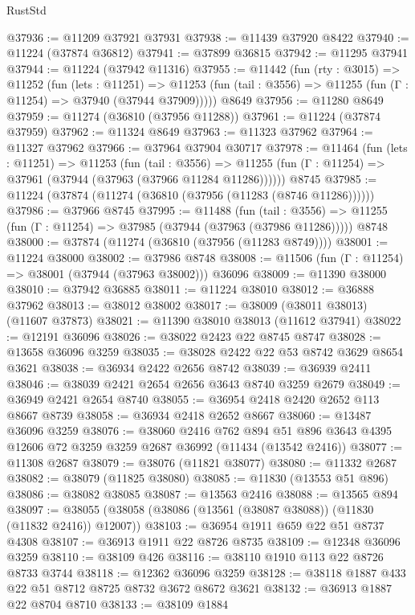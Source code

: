 \begin{lexlean}{RustStd}
\begin{coremodule}
@37936 := @11209 @37921 @37931
@37938 := @11439 @37920 @8422
@37940 := @11224 (@37874 @36812)
@37941 := @37899 @36815
@37942 := @11295 @37941
@37944 := @11224 (@37942 @11316)
@37955 := @11442
    (fun (rty : @3015) =>
    @11252
      (fun (lets : @11251) =>
      @11253 (fun (tail : @3556) => @11255 (fun (Γ : @11254) => @37940 (@37944 @37909)))))
    @8649
@37956 := @11280 @8649
@37959 := @11274 (@36810 (@37956 @11288))
@37961 := @11224 (@37874 @37959)
@37962 := @11324 @8649
@37963 := @11323 @37962
@37964 := @11327 @37962
@37966 := @37964 @37904 @30717
@37978 := @11464
    (fun (lets : @11251) =>
    @11253
      (fun (tail : @3556) =>
      @11255 (fun (Γ : @11254) => @37961 (@37944 (@37963 (@37966 @11284 @11286))))))
    @8745
@37985 := @11224 (@37874 (@11274 (@36810 (@37956 (@11283 (@8746 @11286))))))
@37986 := @37966 @8745
@37995 := @11488
    (fun (tail : @3556) => @11255 (fun (Γ : @11254) => @37985 (@37944 (@37963 (@37986 @11286)))))
    @8748
@38000 := @37874 (@11274 (@36810 (@37956 (@11283 @8749))))
@38001 := @11224 @38000
@38002 := @37986 @8748
@38008 := @11506 (fun (Γ : @11254) => @38001 (@37944 (@37963 @38002))) @36096
@38009 := @11390 @38000
@38010 := @37942 @36885
@38011 := @11224 @38010
@38012 := @36888 @37962
@38013 := @38012 @38002
@38017 := @38009 (@38011 @38013) (@11607 @37873)
@38021 := @11390 @38010 @38013 (@11612 @37941)
@38022 := @12191 @36096
@38026 := @38022 @2423 @22 @8745 @8747
@38028 := @13658 @36096 @3259
@38035 := @38028 @2422 @22 @53 @8742 @3629 @8654 @3621
@38038 := @36934 @2422 @2656 @8742
@38039 := @36939 @2411
@38046 := @38039 @2421 @2654 @2656 @3643 @8740 @3259 @2679
@38049 := @36949 @2421 @2654 @8740
@38055 := @36954 @2418 @2420 @2652 @113 @8667 @8739
@38058 := @36934 @2418 @2652 @8667
@38060 := @13487 @36096 @3259
@38076 := @38060
    @2416
    @762
    @894
    @51
    @896
    @3643
    @4395
    @12606
    @72
    @3259
    @3259
    @2687
    @36992
    (@11434 (@13542 @2416))
@38077 := @11308 @2687
@38079 := @38076 (@11821 @38077)
@38080 := @11332 @2687
@38082 := @38079 (@11825 @38080)
@38085 := @11830 (@13553 @51 @896)
@38086 := @38082 @38085
@38087 := @13563 @2416
@38088 := @13565 @894
@38097 := @38055 (@38058 (@38086 (@13561 (@38087 @38088)) (@11830 (@11832 @2416)) @12007))
@38103 := @36954 @1911 @659 @22 @51 @8737 @4308
@38107 := @36913 @1911 @22 @8726 @8735
@38109 := @12348 @36096 @3259
@38110 := @38109 @426
@38116 := @38110 @1910 @113 @22 @8726 @8733 @3744
@38118 := @12362 @36096 @3259
@38128 := @38118 @1887 @433 @22 @51 @8712 @8725 @8732 @3672 @8672 @3621
@38132 := @36913 @1887 @22 @8704 @8710
@38133 := @38109 @1884

\end{coremodule}
\end{lexlean}
